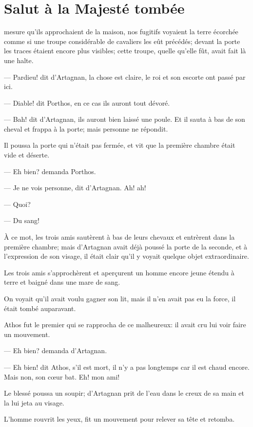 \chapter{Salut à la Majesté tombée}

\lettrine{}{} mesure qu'ils approchaient de la maison, nos fugitifs voyaient la terre écorchée comme si une troupe considérable de cavaliers les eût précédés; devant la porte les traces étaient encore plus visibles; cette troupe, quelle qu'elle fût, avait fait là une halte.

— Pardieu! dit d'Artagnan, la chose est claire, le roi et son escorte ont passé par ici.

— Diable! dit Porthos, en ce cas ils auront tout dévoré.

— Bah! dit d'Artagnan, ils auront bien laissé une poule. Et il sauta à bas de son cheval et frappa à la porte; mais personne ne répondit.

Il poussa la porte qui n'était pas fermée, et vit que la première chambre était vide et déserte.

— Eh bien? demanda Porthos.

— Je ne vois personne, dit d'Artagnan. Ah! ah!

— Quoi?

— Du sang!

À ce mot, les trois amis sautèrent à bas de leurs chevaux et entrèrent dans la première chambre; mais d'Artagnan avait déjà poussé la porte de la seconde, et à l'expression de son visage, il était clair qu'il y voyait quelque objet extraordinaire.

Les trois amis s'approchèrent et aperçurent un homme encore jeune étendu à terre et baigné dans une mare de sang.

On voyait qu'il avait voulu gagner son lit, mais il n'en avait pas eu la force, il était tombé auparavant.

Athos fut le premier qui se rapprocha de ce malheureux: il avait cru lui voir faire un mouvement.

— Eh bien? demanda d'Artagnan.

— Eh bien! dit Athos, s'il est mort, il n'y a pas longtemps car il est chaud encore. Mais non, son cœur bat. Eh! mon ami!

Le blessé poussa un soupir; d'Artagnan prit de l'eau dans le creux de sa main et la lui jeta au visage.

L'homme rouvrit les yeux, fit un mouvement pour relever sa tête et retomba.

